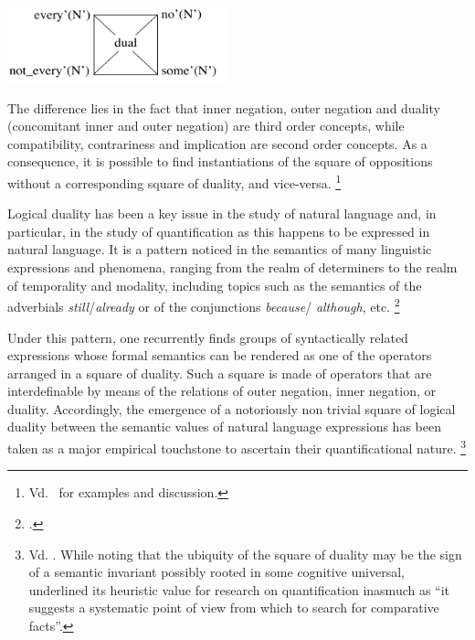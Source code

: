 \documentclass[output=paper
,modfonts
,nonflat]{langsci/langscibook}
\begin{document}



\begin{exe}
\ex
\end{exe}
\vspace{-7mm}
\centerline{\hspace{0 mm}\includegraphics[width=15pc]{figures/classicalSquareDuality.pdf}}


The difference lies in the fact that inner negation, outer
negation and duality (concomitant inner and outer negation) are third order concepts, while compatibility, contrariness and
implication are second order concepts. As a consequence, it is possible
to find instantiations of the square of oppositions without a
corresponding square of duality, and vice-versa.%
\footnote{
Vd.~\citep{Lobner1987} for examples and discussion.
}


Logical duality has been a key issue in the study of natural language 
and, in particular, in the study of quantification as this happens to
be expressed in natural language.  It is a pattern noticed in the
semantics  of many linguistic expressions and phenomena, ranging from
the realm  of determiners to the realm of temporality and modality,
including topics  such as the semantics of the adverbials {\em
still}/\emph{already} or of the conjunctions  \emph{because}/{\em
although}, etc.%
\footnote{
\citep{Lobner1987, Lobner1989, Lobner1999, terMeulen1988, Konig1991, Smessaert1997}.
}

Under this pattern, one recurrently finds groups of syntactically related 
expressions whose formal semantics can be rendered as one of the operators
arranged in a square of duality. Such a square is made of operators that 
are interdefinable by means of the relations of outer negation, inner
negation, or duality.
Accordingly, 
the emergence of a notoriously non trivial square of logical duality
between the semantic values of natural language expressions has been taken 
as a major empirical touchstone to ascertain their quantificational nature.%
\footnote{
Vd. \citep{Lobner1987,vanBenthem1991}. While noting that the ubiquity of the square of duality 
may be the sign of a semantic invariant possibly rooted in some cognitive universal,  
\citep[p.23]{vanBenthem1991} underlined its heuristic value for research
on quantification inasmuch as ``it suggests a systematic point of view from
which to search for comparative facts''.
}
\end{document}
